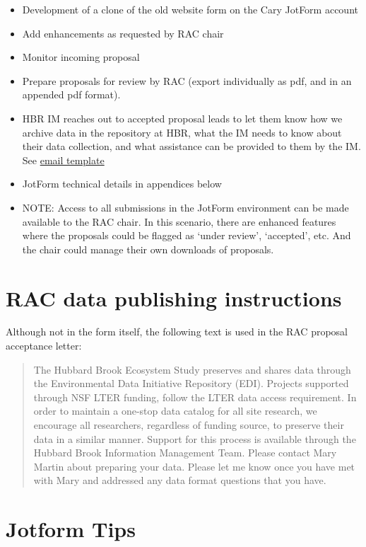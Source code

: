 \documentclass[
  letterpaper,
  DIV=11,
  numbers=noendperiod]{scrreprt}
\begin{document}
\begin{itemize}
\item
  Development of a clone of the old website form on the Cary JotForm
  account
\item
  Add enhancements as requested by RAC chair
\item
  Monitor incoming proposal
\item
  Prepare proposals for review by RAC (export individually as pdf, and
  in an appended pdf format).
\item
  HBR IM reaches out to accepted proposal leads to let them know how we
  archive data in the repository at HBR, what the IM needs to know about
  their data collection, and what assistance can be provided to them by
  the IM. See \href{TBD}{email template}
\item
  JotForm technical details in appendices below
\item
  NOTE: Access to all submissions in the JotForm environment can be made
  available to the RAC chair. In this scenario, there are enhanced
  features where the proposals could be flagged as `under review',
  `accepted', etc. And the chair could manage their own downloads of
  proposals.
\end{itemize}

\section{RAC data publishing
instructions}\label{rac-data-publishing-instructions}

Although not in the form itself, the following text is used in the RAC
proposal acceptance letter:

\begin{quote}
The Hubbard Brook Ecosystem Study preserves and shares data through the
Environmental Data Initiative Repository (EDI). Projects supported
through NSF LTER funding, follow the LTER data access requirement. In
order to maintain a one-stop data catalog for all site research, we
encourage all researchers, regardless of funding source, to preserve
their data in a similar manner. Support for this process is available
through the Hubbard Brook Information Management Team. Please contact
Mary Martin about preparing your data. Please let me know once you have
met with Mary and addressed any data format questions that you have.
\end{quote}

\section{Jotform Tips}\label{jotform-tips}
\end{document}
